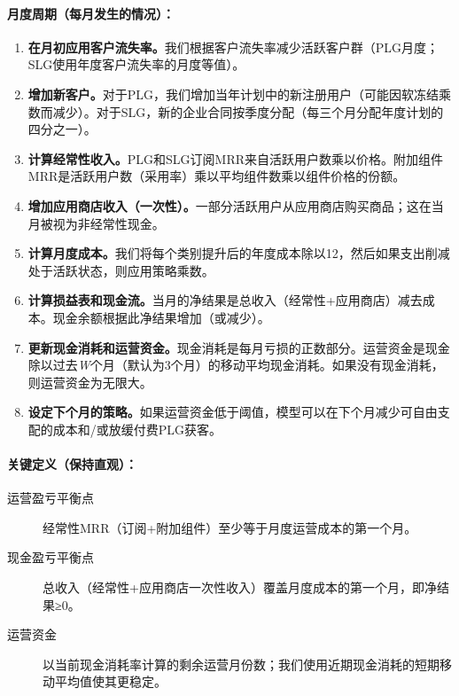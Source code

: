 \documentclass[11pt, a4paper, oneside]{article}
\begin{document}
\paragraph{月度周期（每月发生的情况）：}
\begin{enumerate}
\item \textbf{在月初应用客户流失率。}我们根据客户流失率减少活跃客户群（PLG月度；SLG使用年度客户流失率的月度等值）。
\item \textbf{增加新客户。}对于PLG，我们增加当年计划中的新注册用户（可能因软冻结乘数而减少）。对于SLG，新的企业合同按季度分配（每三个月分配年度计划的四分之一）。
\item \textbf{计算经常性收入。}PLG和SLG订阅MRR来自活跃用户数乘以价格。附加组件MRR是活跃用户数（采用率）乘以平均组件数乘以组件价格的份额。
\item \textbf{增加应用商店收入（一次性）。}一部分活跃用户从应用商店购买商品；这在当月被视为非经常性现金。
\item \textbf{计算月度成本。}我们将每个类别提升后的年度成本除以12，然后如果支出削减处于活跃状态，则应用策略乘数。
\item \textbf{计算损益表和现金流。}当月的净结果是总收入（经常性+应用商店）减去成本。现金余额根据此净结果增加（或减少）。
\item \textbf{更新现金消耗和运营资金。}现金消耗是每月亏损的正数部分。运营资金是现金除以过去\emph{W}个月（默认为3个月）的移动平均现金消耗。如果没有现金消耗，则运营资金为无限大。
\item \textbf{设定下个月的策略。}如果运营资金低于阈值，模型可以在下个月减少可自由支配的成本和/或放缓付费PLG获客。
\end{enumerate}


\paragraph{关键定义（保持直观）：}
\begin{description}
\item[运营盈亏平衡点] 经常性MRR（订阅+附加组件）至少等于月度运营成本的第一个月。
\item[现金盈亏平衡点] 总收入（经常性+应用商店一次性收入）覆盖月度成本的第一个月，即净结果≥0。
\item[运营资金] 以当前现金消耗率计算的剩余运营月份数；我们使用近期现金消耗的短期移动平均值使其更稳定。
\end{description}
\end{document}
